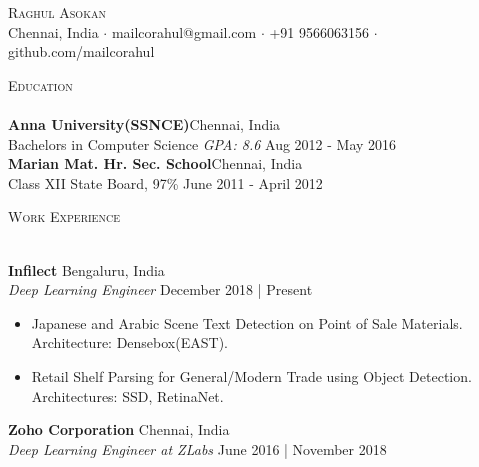\documentclass[a4paper]{article}
\newcommand{\lineunder} {
    \vspace*{-8pt} \\
    \hspace*{-18pt} \hrulefill \\
}
\newcommand{\header} [1] {
    {\hspace*{-18pt}\vspace*{6pt} \textsc{#1}}
    \vspace*{-6pt} \lineunder
}
\begin{document}
\vspace*{-40pt}

    

\vspace*{-10pt}
\begin{center}
	{\Huge \scshape {Raghul Asokan}}\\
	Chennai, India $\cdot$ mailcorahul@gmail.com $\cdot$ +91 9566063156 $\cdot$ github.com/mailcorahul\\
\end{center}

\header{Education}
\textbf{Anna University(SSNCE)}\hfill Chennai, India\\
Bachelor\textquotesingle{}s in Computer Science \textit{GPA: 8.6} \hfill Aug 2012 - May 2016\\
\vspace{2mm}
\textbf{Marian Mat. Hr. Sec. School}\hfill Chennai, India\\
Class XII State Board, 97\% \hfill June 2011 - April 2012\\
\vspace{2mm}

\header{Work Experience}
\vspace{1mm}

\textbf{Infilect} \hfill Bengaluru, India\\
\textit{Deep Learning Engineer} \hfill December 2018 | Present\\

\begin{itemize}
    \itemsep-0.5em
    \item Japanese and Arabic Scene Text Detection on Point of Sale Materials. Architecture: Densebox(EAST).
    \item Retail Shelf Parsing for General/Modern Trade using Object Detection. Architectures: SSD, RetinaNet.
\end{itemize}
\vspace*{1mm}

\textbf{Zoho Corporation} \hfill Chennai, India\\
\textit{Deep Learning Engineer at ZLabs} \hfill June 2016 | November 2018\\
\end{document}
